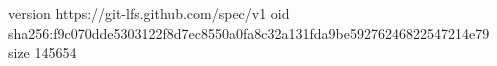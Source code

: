 version https://git-lfs.github.com/spec/v1
oid sha256:f9c070dde5303122f8d7ec8550a0fa8c32a131fda9be59276246822547214e79
size 145654
